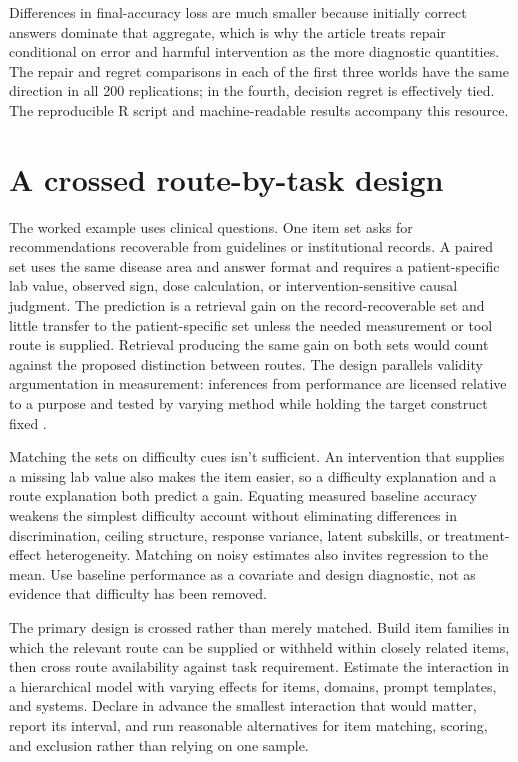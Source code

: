 \documentclass[12pt]{article}
\begin{document}
Differences in final-accuracy loss are much smaller because initially correct answers
dominate that aggregate, which is why the article treats repair conditional on error and
harmful intervention as the more diagnostic quantities. The repair and regret comparisons
in each of the first three worlds have the same direction in all 200 replications; in the
fourth, decision regret is effectively tied. The reproducible R script and machine-readable
results accompany this resource.

\section{A crossed route-by-task design}

The worked example uses clinical questions. One item set asks for recommendations
recoverable from guidelines or institutional records. A paired set uses the same disease
area and answer format and requires a patient-specific lab value, observed sign, dose
calculation, or intervention-sensitive causal judgment. The prediction is a retrieval
gain on the record-recoverable set and little transfer to the patient-specific set unless
the needed measurement or tool route is supplied. Retrieval producing the same gain on
both sets would count against the proposed distinction between routes. The design parallels
validity argumentation in measurement: inferences from performance are licensed relative
to a purpose and tested by varying method while holding the target construct fixed
\citep{messick_1989_validity,kane2013validating}.

Matching the sets on difficulty cues isn't sufficient. An intervention that supplies a
missing lab value also makes the item easier, so a difficulty explanation and a route
explanation both predict a gain. Equating measured baseline accuracy weakens the simplest
difficulty account without eliminating differences in discrimination, ceiling structure,
response variance, latent subskills, or treatment-effect heterogeneity. Matching on noisy
estimates also invites regression to the mean. Use baseline performance as a covariate and
design diagnostic, not as evidence that difficulty has been removed.

The primary design is crossed rather than merely matched. Build item families in which the
relevant route can be supplied or withheld within closely related items, then cross route
availability against task requirement. Estimate the interaction in a hierarchical model
with varying effects for items, domains, prompt templates, and systems. Declare in advance
the smallest interaction that would matter, report its interval, and run reasonable
alternatives for item matching, scoring, and exclusion rather than relying on one sample.
\end{document}
